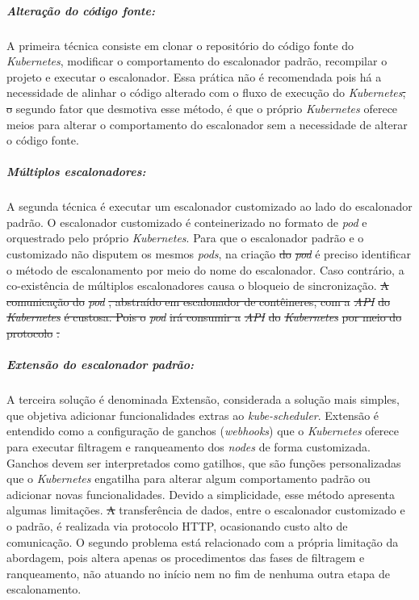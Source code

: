 \documentclass[
	12pt,				%
	openright,			%
	oneside,			%
	a4paper,			%
	brazil				%
	]{abntex2}
\providecommand{\DIFaddtex}[1]{{\protect\color{blue}\uwave{#1}}} %
\providecommand{\DIFdeltex}[1]{{\protect\color{red}\sout{#1}}}                      %
\providecommand{\DIFaddbegin}{} %
\providecommand{\DIFaddend}{} %
\providecommand{\DIFdelbegin}{} %
\providecommand{\DIFdelend}{} %
\providecommand{\DIFadd}[1]{\texorpdfstring{\DIFaddtex{#1}}{#1}} %
\providecommand{\DIFdel}[1]{\texorpdfstring{\DIFdeltex{#1}}{}} %
\newcommand{\DIFscaledelfig}{0.5}
\newlength{\DIFdelgraphicswidth} %
\newlength{\DIFdelgraphicsheight} %
\newcommand{\DIFaddincludegraphics}[2][]{{\color{blue}\fbox{\DIFOincludegraphics[#1]{#2}}}} %
\newcommand{\DIFdelincludegraphics}[2][]{%
\sbox{\DIFdelgraphicsbox}{\DIFOincludegraphics[#1]{#2}}%
\settoboxwidth{\DIFdelgraphicswidth}{\DIFdelgraphicsbox} %
\settoboxtotalheight{\DIFdelgraphicsheight}{\DIFdelgraphicsbox} %
\scalebox{\DIFscaledelfig}{%
\parbox[b]{\DIFdelgraphicswidth}{\usebox{\DIFdelgraphicsbox}\\[-\baselineskip] \rule{\DIFdelgraphicswidth}{0em}}\llap{\resizebox{\DIFdelgraphicswidth}{\DIFdelgraphicsheight}{%
\setlength{\unitlength}{\DIFdelgraphicswidth}%
\begin{picture}(1,1)%
\thicklines\linethickness{2pt} %
{\color[rgb]{1,0,0}\put(0,0){\framebox(1,1){}}}%
{\color[rgb]{1,0,0}\put(0,0){\line( 1,1){1}}}%
{\color[rgb]{1,0,0}\put(0,1){\line(1,-1){1}}}%
\end{picture}%
}\hspace*{3pt}}} %
} %
\DeclareRobustCommand{\DIFaddbegin}{\DIFOaddbegin \let\includegraphics\DIFaddincludegraphics} %
\DeclareRobustCommand{\DIFaddend}{\DIFOaddend \let\includegraphics\DIFOincludegraphics} %
\DeclareRobustCommand{\DIFdelbegin}{\DIFOdelbegin \let\includegraphics\DIFdelincludegraphics} %
\DeclareRobustCommand{\DIFdelend}{\DIFOaddend \let\includegraphics\DIFOincludegraphics} %
\begin{document}
\subparagraph{Alteração do código fonte:}
A primeira técnica consiste em clonar o repositório do código fonte do \textit{Kubernetes}, modificar o comportamento do escalonador padrão, recompilar o projeto e executar o escalonador. Essa prática não é recomendada pois há a necessidade de alinhar o código alterado com o fluxo de execução do \textit{Kubernetes}\DIFdelbegin \DIFdel{, o }\DIFdelend \DIFaddbegin \DIFadd{.
O }\DIFaddend segundo fator que desmotiva esse método, é que o próprio \textit{Kubernetes} oferece meios para alterar o comportamento do escalonador sem a necessidade de alterar o código fonte.

\subparagraph{Múltiplos escalonadores:}
A segunda técnica é executar um escalonador customizado ao lado do escalonador padrão. O escalonador customizado é conteinerizado no formato de \textit{pod} e orquestrado pelo próprio \textit{Kubernetes}. Para que o escalonador padrão e o customizado não disputem os mesmos \textit{pods}, na criação \DIFdelbegin \DIFdel{do }\DIFdelend \DIFaddbegin \DIFadd{de novos }\DIFaddend \textit{\DIFdelbegin \DIFdel{pod}\DIFdelend \DIFaddbegin \DIFadd{pods}\DIFaddend } é preciso identificar o método de escalonamento por meio do nome do escalonador. Caso contrário, a co-existência de múltiplos escalonadores causa o bloqueio de sincronização. 
\DIFdelbegin \DIFdel{A comunicação do }\textit{\DIFdel{pod}}%
\DIFdel{, abstraído em escalonador de contêineres, com a }\textit{\DIFdel{API}} %
\DIFdel{do }\textit{\DIFdel{Kubernetes}} %
\DIFdel{é custosa. Pois o }\textit{\DIFdel{pod}} %
\DIFdel{irá consumir a }\textit{\DIFdel{API}} %
\DIFdel{do }\textit{\DIFdel{Kubernetes}} %
\DIFdel{por meio do protocolo }%
\DIFdel{.
}\DIFdelend %

\subparagraph{Extensão do escalonador padrão:}
A terceira solução é denominada Extensão, considerada a solução mais simples, que objetiva adicionar funcionalidades extras ao \textit{kube-scheduler}. Extensão é entendido como a configuração de ganchos (\textit{webhooks}) que o \textit{Kubernetes} oferece para executar filtragem e ranqueamento dos \textit{nodes} de forma customizada. Ganchos devem ser interpretados como gatilhos, que são funções personalizadas que o \textit{Kubernetes} engatilha para alterar algum comportamento padrão ou adicionar novas funcionalidades. Devido a simplicidade, esse método apresenta algumas limitações. 
\DIFdelbegin \DIFdel{A }\DIFdelend \DIFaddbegin \DIFadd{Por exemplo, a }\DIFaddend transferência de dados, entre o escalonador customizado e o padrão, é realizada via protocolo \ac{HTTP}, ocasionando custo alto de comunicação. O segundo problema está relacionado com a própria limitação da abordagem, pois altera apenas os procedimentos das fases de filtragem e ranqueamento, não atuando no início nem no fim de nenhuma outra etapa de escalonamento. 
\end{document}

